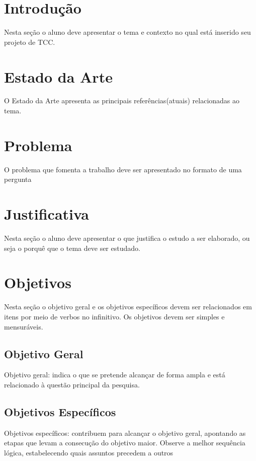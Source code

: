 \documentclass[a4paper,12pt]{article}
\begin{document}


\newpage
\tableofcontents

\newpage
\section{Introdução}
\label{sc:introducao}
Nesta seção o aluno deve apresentar o tema e contexto no qual está inserido seu projeto de TCC.


\section{Estado da Arte}
O Estado da Arte apresenta as principais referências(atuais) relacionadas ao tema.

\section{Problema}
\label{sc:problema}
O problema que fomenta a trabalho deve ser apresentado no formato de uma pergunta


\section{Justificativa}
Nesta seção o aluno deve apresentar o que justifica o estudo a ser elaborado, ou seja o porquê que o tema deve ser estudado.

\section{Objetivos}
\label{sc:objetivos}
Nesta seção o objetivo geral e os objetivos específicos devem ser relacionados em itens por meio de verbos no infinitivo. Os objetivos devem ser simples e mensuráveis.

\subsection{Objetivo Geral}
Objetivo geral: indica o que se pretende alcançar de forma ampla e está relacionado à questão principal da pesquisa.

\subsection{Objetivos Específicos}
Objetivos específicos: contribuem para alcançar o objetivo geral, apontando as etapas que levam a consecução do objetivo maior. Observe a melhor sequência lógica, estabelecendo quais assuntos precedem a outros
\end{document}
